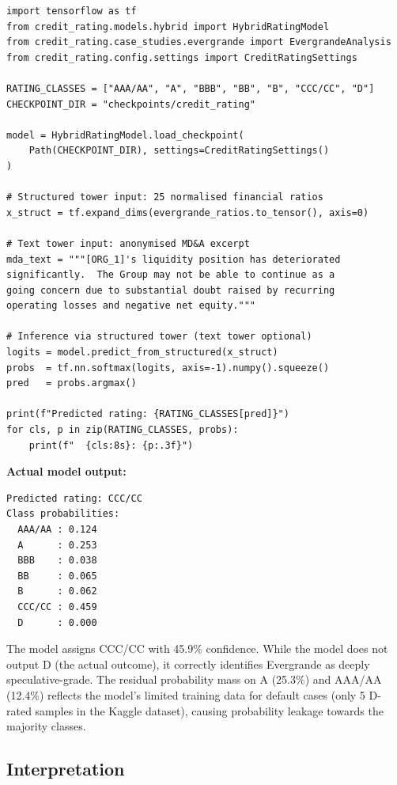 \documentclass[12pt, a4paper]{article}
\begin{document}
\begin{lstlisting}[caption={Hybrid model inference on Evergrande (TensorFlow)}, label=lst:inference]
import tensorflow as tf
from credit_rating.models.hybrid import HybridRatingModel
from credit_rating.case_studies.evergrande import EvergrandeAnalysis
from credit_rating.config.settings import CreditRatingSettings

RATING_CLASSES = ["AAA/AA", "A", "BBB", "BB", "B", "CCC/CC", "D"]
CHECKPOINT_DIR = "checkpoints/credit_rating"

model = HybridRatingModel.load_checkpoint(
    Path(CHECKPOINT_DIR), settings=CreditRatingSettings()
)

# Structured tower input: 25 normalised financial ratios
x_struct = tf.expand_dims(evergrande_ratios.to_tensor(), axis=0)

# Text tower input: anonymised MD&A excerpt
mda_text = """[ORG_1]'s liquidity position has deteriorated
significantly.  The Group may not be able to continue as a
going concern due to substantial doubt raised by recurring
operating losses and negative net equity."""

# Inference via structured tower (text tower optional)
logits = model.predict_from_structured(x_struct)
probs  = tf.nn.softmax(logits, axis=-1).numpy().squeeze()
pred   = probs.argmax()

print(f"Predicted rating: {RATING_CLASSES[pred]}")
for cls, p in zip(RATING_CLASSES, probs):
    print(f"  {cls:8s}: {p:.3f}")
\end{lstlisting}

\noindent \textbf{Actual model output:}
\begin{verbatim}
Predicted rating: CCC/CC
Class probabilities:
  AAA/AA : 0.124
  A      : 0.253
  BBB    : 0.038
  BB     : 0.065
  B      : 0.062
  CCC/CC : 0.459
  D      : 0.000
\end{verbatim}

\noindent The model assigns CCC/CC with 45.9\% confidence.  While the model does not output D (the actual outcome), it correctly identifies Evergrande as deeply speculative-grade.  The residual probability mass on A (25.3\%) and AAA/AA (12.4\%) reflects the model's limited training data for default cases (only 5 D-rated samples in the Kaggle dataset), causing probability leakage towards the majority classes.

\subsection{Interpretation}
\end{document}
